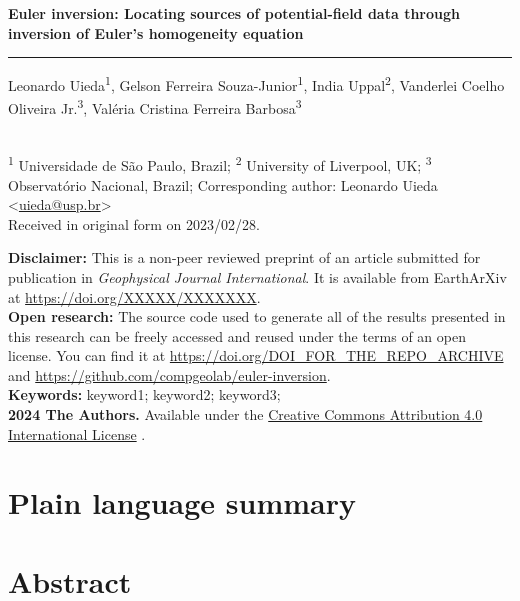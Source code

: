 \documentclass[onecolumn,10pt]{article}
\makeatletter
\newcommand{\Title}{Euler inversion: Locating sources of potential-field data through inversion of Euler's homogeneity equation}
\newcommand{\Year}{2024}
\newcommand{\SubmittedOn}{2023/02/28}
\newcommand{\PublishedOn}{2023/02/28}
\newcommand{\AuthorShort}{Uieda et al.}
\newcommand{\Authors}{%
  Leonardo Uieda\textsuperscript{1},
  Gelson Ferreira Souza-Junior\textsuperscript{1},
  India Uppal\textsuperscript{2},
  Vanderlei Coelho Oliveira Jr.\textsuperscript{3},
  Valéria Cristina Ferreira Barbosa\textsuperscript{3}
}
\newcommand{\Email}{uieda@usp.br}
\newcommand{\Corresponding}{%
  Corresponding author: Leonardo Uieda <\href{mailto:\Email}{\Email}>
}
\newcommand{\Affiliations}{%
  \textsuperscript{1} Universidade de São Paulo, Brazil;
  \textsuperscript{2} University of Liverpool, UK;
  \textsuperscript{3} Observatório Nacional, Brazil;
}
\newcommand{\Journal}{Geophysical Journal International}
\newcommand{\JournalDOI}{YYYYY/YYYYYYY}
\newcommand{\PreprintDOI}{XXXXX/XXXXXXX}
\newcommand{\ArchiveDOI}{DOI_FOR_THE_REPO_ARCHIVE}
\newcommand{\GitHubRepository}{compgeolab/euler-inversion}
\newcommand{\Keywords}{%
  keyword1; keyword2; keyword3;
}
\makeatother
\begin{document}
\thispagestyle{plain}
\begin{FlushLeft}
  \begin{spacing}{2}
    {\LARGE\bfseries \Title}
  \end{spacing}
  {\color{lightgray}\hrule height 1.5pt}
  \vspace{0.3cm}
  \Authors
  \\[0.2cm]
  {\footnotesize \Affiliations}
  \newline
  {\footnotesize \Corresponding}
  \\[0.2cm]
  {\footnotesize
    Received in original form on \SubmittedOn.
  }
\end{FlushLeft}

\begin{summarybox}
  \noindent
  \textbf{Disclaimer:}
  This is a non-peer reviewed preprint of an article submitted for publication
  in \textit{\Journal{}}. It is available from EarthArXiv at
  \url{https://doi.org/\PreprintDOI}.
  \\[0.25cm]
  \noindent
  \textbf{Open research:}
  The source code used to generate all of the results presented in this
  research can be freely accessed and reused under the terms of an open license.
  You can find it at \url{https://doi.org/\ArchiveDOI} and
  \url{https://github.com/\GitHubRepository}.
  \\[0.25cm]
  \noindent
  \textbf{Keywords:} \Keywords{}
  \\[0.25cm]
  \noindent
  \textbf{\textcopyright{} \Year{} The Authors.}
  Available under the \href{https://creativecommons.org/licenses/by/4.0/}{Creative Commons Attribution 4.0 International License}
  \faCreativeCommons\faCreativeCommonsBy{}.
\end{summarybox}

\section*{\normalsize Plain language summary}
\begingroup
   \small  \par
\endgroup

\section*{\normalsize Abstract}
\begingroup
   \small  \par
\endgroup





\end{document}

